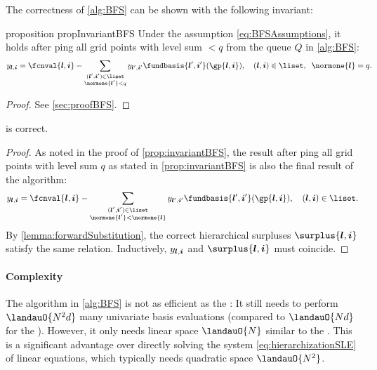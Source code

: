 The correctness of \cref{alg:BFS} can be shown with the following invariant:

\begin{restatable}{%
  proposition%
}{%
  propInvariantBFS%
}
  \label{prop:invariantBFS}
  Under the assumption \eqref{eq:BFSAssumptions},
  it holds after \pop{}ping all grid points with level sum $< q$
  from the queue $Q$ in \cref{alg:BFS}:
  \begin{equation}
    \label{eq:propInvariantBFS}
    \linout{\*l,\*i}
    = \fcnval{\*l,\*i} -
    \sum_{\substack{(\*l',\*i')\in\liset\\\normone{\*l'} < q}}
    \linout{\*l',\*i'} \fundbasis{\*l',\*i'}(\gp{\*l,\*i}),\quad
    (\*l, \*i) \in \liset,\;\;
    \normone{\*l} = q.
    \hspace*{-6mm}
  \end{equation}
\end{restatable}

\begin{proof}
  See \cref{sec:proofBFS}.
\end{proof}

\begin{shortcorollary}
  \label{cor:algBFSCorrectness}
   is correct.
\end{shortcorollary}

\begin{proof}
  As noted in the proof of \cref{prop:invariantBFS},
  the result after \pop{}ping all grid points with level sum
  $q$ as stated in \cref{prop:invariantBFS} is also the final result
  of the algorithm:
  \begin{equation}
    \linout{\*l,\*i}
    = \fcnval{\*l,\*i} -
    \sum_{\substack{(\*l',\*i')\in\liset\\\normone{\*l'} < \normone{\*l}}}
    \linout{\*l',\*i'} \fundbasis{\*l',\*i'}(\gp{\*l,\*i}),\quad
    (\*l, \*i) \in \liset.
  \end{equation}
  By \cref{lemma:forwardSubstitution},
  the correct hierarchical surpluses $\surplus{\*l,\*i}$
  satisfy the same relation.
  Inductively, $\linout{\*l,\*i}$ and $\surplus{\*l,\*i}$ must coincide.
\end{proof}

\paragraph{Complexity}

The \bfs algorithm in \cref{alg:BFS} is not as efficient as the \up:
It still needs to perform $\landauO{N^2 d}$ many univariate
basis evaluations (compared to $\landauO{Nd}$ for the \up).
However, it only needs linear space $\landauO{N}$ similar to the \up.
This is a significant advantage over directly solving the system
\eqref{eq:hierarchizationSLE} of linear equations, which typically
needs quadratic space $\landauO{N^2}$.




